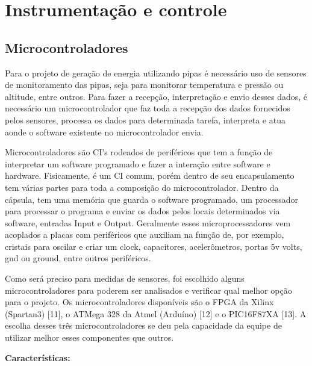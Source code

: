 \chapter{Instrumentação e controle}

\section{Microcontroladores}
 
Para o projeto de geração de energia utilizando pipas é necessário uso de sensores de monitoramento das pipas, seja para monitorar temperatura e pressão ou altitude, entre outros. Para fazer a recepção, interpretação e envio desses dados, é necessário um microcontrolador que faz toda a recepção dos dados fornecidos pelos sensores, processa os dados para determinada tarefa, interpreta e atua aonde o software existente no microcontrolador envia.

Microcontroladores são CI’s rodeados de periféricos que tem a função de interpretar um software programado e fazer a interação entre software e hardware. Fisicamente, é um CI comum, porém dentro de seu encapsulamento tem várias partes para toda a composição do microcontrolador. Dentro da cápsula, tem uma memória que guarda o software programado, um processador para processar o programa e enviar os dados pelos locais determinados via software, entradas Input e Output. Geralmente esses microprocessadores vem acoplados a placas com periféricos que auxiliam na função de, por exemplo, cristais para oscilar e criar um clock, capacitores, acelerômetros, portas 5v volts, gnd ou ground, entre outros periféricos.

Como será preciso para medidas de sensores, foi escolhido alguns microcontroladores para poderem ser analisados e verificar qual melhor opção para o projeto. Os microcontroladores disponíveis são o FPGA da Xilinx (Spartan3) [11], o ATMega 328 da Atmel (Arduíno) [12] e o PIC16F87XA [13]. A escolha desses três microcontroladores se deu pela capacidade da equipe de utilizar melhor esses componentes que outros.
 
\textbf{Características:}

